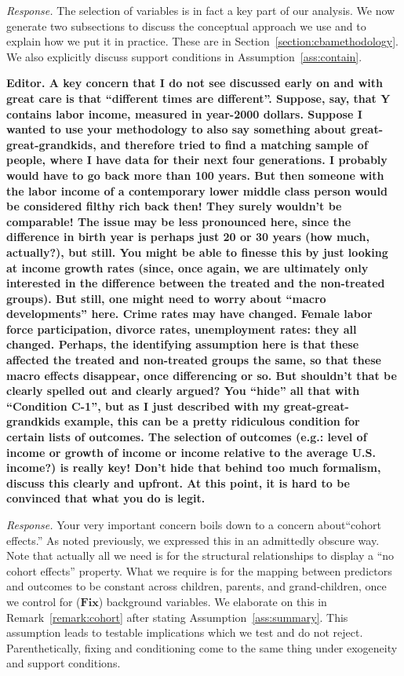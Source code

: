 \noindent \textit{Response.} The selection of variables is in fact a key part of our analysis. We now generate two subsections to discuss the conceptual approach we use and to explain how we put it in practice. These are in Section~\ref{section:cbamethodology}. We also explicitly discuss support conditions in Assumption~\ref{ass:contain}.

\noindent \textbf{Editor. A key concern that I do not see discussed early on and with great care is that ``different times are different''. Suppose, say, that Y contains labor income, measured in year-2000 dollars. Suppose I wanted to use your methodology to also say something about great-great-grandkids, and therefore tried to find a matching sample of people, where I have data for their next four generations. I probably would have to go back more than 100 years. But then someone with the labor income of a contemporary lower middle class person would be considered filthy rich back then! They surely wouldn't be comparable! The issue may be less pronounced here, since the difference in birth year is perhaps just 20 or 30 years (how much, actually?), but still. You might be able to finesse this by just looking at income growth rates (since, once again, we are ultimately only interested in the difference between the treated and the non-treated groups). But still, one might need to worry about ``macro developments'' here. Crime rates may have changed. Female labor force participation, divorce rates, unemployment rates: they all changed. Perhaps, the identifying assumption here is that these affected the treated and non-treated groups the same, so that these macro effects disappear, once differencing or so. But shouldn't that be clearly spelled out and clearly argued? You ``hide'' all that with ``Condition C-1'', but as I just described with my great-great- grandkids example, this can be a pretty ridiculous condition for certain lists of outcomes. The selection of outcomes (e.g.: level of income or growth of income or income relative to the average U.S. income?) is really key! Don't hide that behind too much formalism, discuss this clearly and upfront. At this point, it is hard to be convinced that what you do is legit.}

\noindent \textit{Response.} Your very important concern boils down to a concern about``cohort effects.'' As noted previously, we expressed this in an admittedly obscure way. Note that actually all we need is for the structural relationships to display a ``no cohort effects'' property. What we require is for the mapping between predictors and outcomes to be constant across children, parents, and grand-children, once we control for ($\bm{Fix}$) background variables. We elaborate on this in Remark~\ref{remark:cohort} after stating Assumption~\ref{ass:summary}. This assumption leads to testable implications which we test and do not reject. Parenthetically, fixing and conditioning come to the same thing under exogeneity and support conditions.


